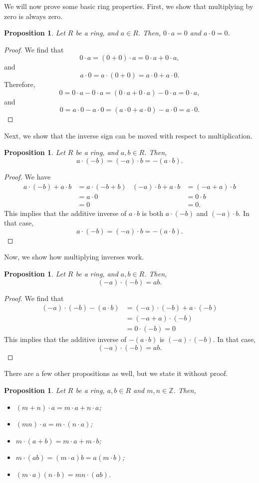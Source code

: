 \documentclass[a4paper, openany]{memoir}
\theoremstyle{definition}
\theoremstyle{plain}
\newtheorem{proposition}[definition]{Proposition}
\begin{document}
We will now prove some basic ring properties. First, we show that multiplying by zero is always zero.
\begin{proposition}
Let $R$ be a ring, and $a \in R$. Then, $0 \cdot a = 0$ and $a \cdot 0 = 0$.
\end{proposition}
\begin{proof}
We find that
\[0 \cdot a = (0 + 0) \cdot a = 0 \cdot a + 0 \cdot a,\]
and
\[a \cdot 0 = a \cdot (0 + 0) = a \cdot 0 + a \cdot 0.\]
Therefore,
\[0 = 0 \cdot a - 0 \cdot a = (0 \cdot a + 0 \cdot a) - 0 \cdot a = 0 \cdot a,\]
and
\[0 = a \cdot 0 - a \cdot 0 = (a \cdot 0 + a \cdot 0) - a \cdot 0 = a \cdot 0.\]
\end{proof}
\noindent Next, we show that the inverse sign can be moved with respect to multiplication.
\begin{proposition}
Let $R$ be a ring, and $a, b \in R$. Then,
\[a \cdot (-b) = (-a) \cdot b = -(a \cdot b).\]
\end{proposition}
\begin{proof}
We have
\begin{align*}
    a \cdot (-b) + a \cdot b &= a \cdot (-b + b) & (-a) \cdot b + a \cdot b &= (-a + a) \cdot b \\
    &= a \cdot 0 & &= 0 \cdot b \\
    &= 0 & &= 0.
\end{align*}
This implies that the additive inverse of $a \cdot b$ is both $a \cdot (-b)$ and $(-a) \cdot b$. In that case,
\[a \cdot (-b) = (-a) \cdot b = -(a \cdot b).\]
\end{proof}
\noindent Now, we show how multiplying inverses work.
\begin{proposition}
Let $R$ be a ring, and $a, b \in R$. Then,
\[(-a) \cdot (-b) = ab.\]
\end{proposition}
\begin{proof}
We find that
\begin{align*}
    (-a) \cdot (-b) - (a \cdot b) &= (-a) \cdot (-b) + a \cdot (-b) \\
    &= (-a + a) \cdot (-b) \\
    &= 0 \cdot (-b) = 0
\end{align*}
This implies that the additive inverse of $-(a \cdot b)$ is $(-a) \cdot (-b)$. In that case,
\[(-a) \cdot (-b) = ab.\]
\end{proof}
\noindent There are a few other propositions as well, but we state it without proof.
\begin{proposition}
Let $R$ be a ring, $a, b \in R$ and $m, n \in \mathbb{Z}$. Then, 
\begin{itemize}
    \item $(m + n) \cdot a = m \cdot a + n \cdot a$;
    \item $(mn) \cdot a = m \cdot (n \cdot a)$;
    \item $m \cdot (a + b) = m \cdot a + m \cdot b$;
    \item $m \cdot (ab) = (m \cdot a)b =  a (m \cdot b)$;
    \item $(m \cdot a) (n \cdot b) = mn \cdot (ab)$.
\end{itemize}
\end{proposition}
\end{document}
